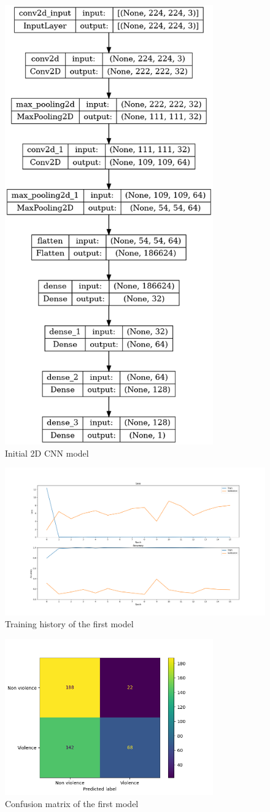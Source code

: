 \begin{figure}[]
    \centering
    \includegraphics[width=0.8\textwidth, height=0.6\textwidth, keepaspectratio]{images/2D_3_noDrop.png}
    \caption{Initial 2D CNN model}
    \label{fig:First2DCNN}
\end{figure}

\begin{figure}[]
    \centering
    \includegraphics[width=1\textwidth]{images/731a-2D3-86ad-history.png}
    \caption{Training history of the first model}
    \label{fig:First2DCNNHistory}
\end{figure}

\begin{figure}[]
    \centering
    \includegraphics[width=0.8\textwidth]{images/731a-2D3-86ad-conf_matrix.png}
    \caption{Confusion matrix of the first model}
    \label{fig:First2DCNNConfusionMatrix}
\end{figure}


